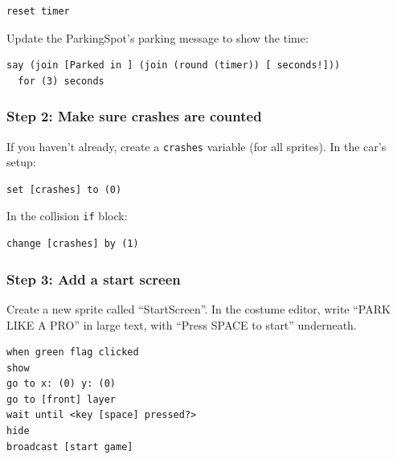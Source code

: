 \documentclass[11pt,a4paper]{article}
\begin{document}
\begin{scratchblockbox}
\begin{lstlisting}[style=scratch]
reset timer
\end{lstlisting}
\end{scratchblockbox}

Update the ParkingSpot's parking message to show the time:

\begin{scratchblockbox}
\begin{lstlisting}[style=scratch]
say (join [Parked in ] (join (round (timer)) [ seconds!]))
  for (3) seconds
\end{lstlisting}
\end{scratchblockbox}

\subsubsection{Step 2: Make sure crashes are counted}

If you haven't already, create a \texttt{crashes} variable (for all sprites). In the car's setup:

\begin{scratchblockbox}
\begin{lstlisting}[style=scratch]
set [crashes] to (0)
\end{lstlisting}
\end{scratchblockbox}

In the collision \texttt{if} block:

\begin{scratchblockbox}
\begin{lstlisting}[style=scratch]
change [crashes] by (1)
\end{lstlisting}
\end{scratchblockbox}

\subsubsection{Step 3: Add a start screen}

Create a new sprite called ``StartScreen''. In the costume editor, write ``PARK LIKE A PRO'' in large text, with ``Press SPACE to start'' underneath.

\begin{scratchblockbox}
\begin{lstlisting}[style=scratch]
when green flag clicked
show
go to x: (0) y: (0)
go to [front] layer
wait until <key [space] pressed?>
hide
broadcast [start game]
\end{lstlisting}
\end{scratchblockbox}
\end{document}
